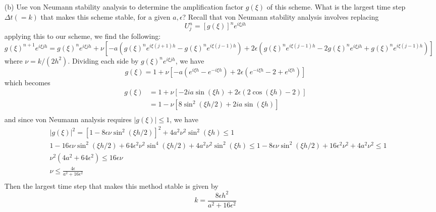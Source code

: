 \documentclass{article}
\begin{document}
\begin{itemize}
    \item[(b)] Use von Neumann stability analysis to determine the amplification factor $g(\xi)$ of this scheme. What is the largest time step $\Delta t (= k)$ that makes this scheme stable, for a given $a, \epsilon$?
    \newline\newline
    Recall that von Neumann stability analysis involves replacing 
    \[U^n_j = [g(\xi)]^ne^{i\xi jh}\]
    applying this to our scheme, we find the following:
    \[g(\xi)^{n+1}e^{i\xi jh} = g(\xi)^ne^{i\xi jh} + \nu[-a(g(\xi)^ne^{i\xi(j+1)h} - g(\xi)^ne^{i\xi(j-1)h}) + 2\epsilon(g(\xi)^ne^{i\xi(j-1)h}-2g(\xi)^ne^{i\xi jh}+g(\xi)^ne^{i\xi(j-1)h})]\]
    where $\nu = k/(2h^2)$.
    \newline
    Dividing each side by $g(\xi)^ne^{i\xi jh}$, we have
    \[g(\xi) = 1 + \nu[-a(e^{i\xi h} - e^{-i\xi h}) + 2\epsilon(e^{-i\xi h} - 2 + e^{i\xi h})]\]
    which becomes
    \begin{align*}
        g(\xi) &= 1 + \nu[-2ia\sin{(\xi h)} + 2\epsilon(2\cos{(\xi h)} - 2)] \\
        &= 1 - \nu[8\sin^2{(\xi h/2)} + 2ia\sin{(\xi h)}] \\
    \end{align*}
    and since von Neumann analysis requires $|g(\xi)| \leq 1$, we have
    \begin{align*}
        &|g(\xi)|^2 = [1 - 8\epsilon\nu\sin^2(\xi h/2)]^2 + 4a^2\nu^2\sin^2(\xi h) \leq 1 \\
        &1 - 16\epsilon\nu\sin^2(\xi h/2) + 64\epsilon^2\nu^2\sin^4(\xi h/2) + 4a^2\nu^2\sin^2(\xi h) \leq 1 - 8\epsilon\nu\sin^2(\xi h/2)+ 16\epsilon^2\nu^2 + 4a^2\nu^2 \leq 1 \\
        &\nu^2(4a^2 + 64\epsilon^2) \leq 16\epsilon\nu \\
        &\nu \leq \frac{4 \epsilon}{a^2 + 16\epsilon^2} \\
    \end{align*}
    Then the largest time step that makes this method stable is given by
    \[k = \frac{8\epsilon h^2}{a^2 + 16\epsilon^2}\]
\end{itemize}
\end{document}
